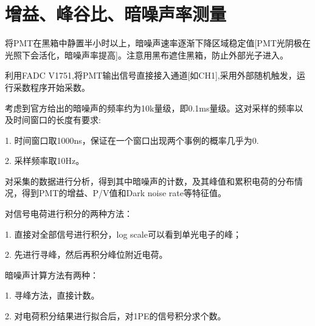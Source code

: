 \documentclass[UTF8,a4paper,12pt]{ctexart}
\begin{document}
\section{增益、峰谷比、暗噪声率测量}
将PMT在黑箱中静置半小时以上，暗噪声速率逐渐下降区域稳定值[PMT光阴极在光照下会活化，暗噪声率提高]。注意用黑布遮住黑箱，防止外部光子进入。\par
利用FADC V1751,将PMT输出信号直接接入通道[如CH1],采用外部随机触发，运行采数程序开始采数。\par
考虑到官方给出的暗噪声的频率约为10k量级，即0.1ms量级。这对采样的频率以及时间窗口的长度有要求:\par
1.	时间窗口取1000ns，保证在一个窗口出现两个事例的概率几乎为0.\par
2.	采样频率取10Hz。\par
对采集的数据进行分析，得到其中暗噪声的计数，及其峰值和累积电荷的分布情况，得到PMT的增益、P/V值和Dark noise rate等特征值。\par
对信号电荷进行积分的两种方法：\par
1.  直接对全部信号进行积分，log scale可以看到单光电子的峰；\par
2.  先进行寻峰，然后再积分峰位附近电荷。\par
暗噪声计算方法有两种：\par
1.  寻峰方法，直接计数。\par
2.  对电荷积分结果进行拟合后，对1PE的信号积分求个数。\par
\end{document}
